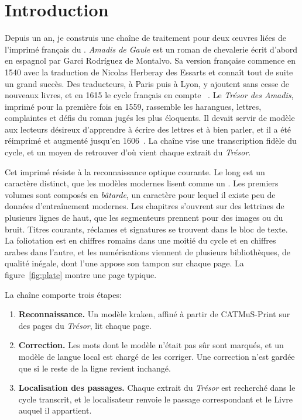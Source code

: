 \section{Introduction}
\label{sec:introduction}

Depuis un an, je construis une chaîne de traitement pour deux œuvres liées de
l'imprimé français du \sxvi. \emph{Amadis de Gaule} est un roman de
chevalerie écrit d'abord en espagnol par Garci Rodríguez de Montalvo. Sa
version française commence en 1540 avec la traduction de Nicolas Herberay des
Essarts et connaît tout de suite un grand succès. Des traducteurs, à Paris puis
à Lyon, y ajoutent sans cesse de nouveaux livres, et en 1615 le cycle français
en compte \ocrBooks{}~\cite{debuzon2011chappuys}. Le \emph{Trésor des Amadis},
imprimé pour la première fois en 1559, rassemble les harangues, lettres,
complaintes et défis du roman jugés les plus éloquents. Il devait servir de
modèle aux lecteurs désireux d'apprendre à écrire des lettres et à bien parler,
et il a été réimprimé et augmenté jusqu'en 1606~\cite{eman2026tresor}. La
chaîne vise une transcription fidèle du cycle, et un moyen de retrouver d'où
vient chaque extrait du \emph{Trésor}.

Cet imprimé résiste à la reconnaissance optique courante. Le  long est
un caractère distinct, que les modèles modernes lisent comme un . Les
premiers volumes sont composés en \emph{bâtarde}, un caractère pour lequel il
existe peu de données d'entraînement modernes. Les chapitres s'ouvrent sur des
lettrines de plusieurs lignes de haut, que les segmenteurs prennent pour des
images ou du bruit. Titres courants, réclames et signatures se trouvent dans le
bloc de texte. La foliotation est en chiffres romains dans une moitié du cycle
et en chiffres arabes dans l'autre, et les numérisations viennent de plusieurs
bibliothèques, de qualité inégale, dont l'une appose son tampon sur chaque
page. La figure~\ref{fig:plate} montre une page typique.

La chaîne comporte trois étapes:
\begin{enumerate}
  \item \textbf{Reconnaissance.} Un modèle kraken, affiné à partir de
    CATMuS-Print sur des pages du \emph{Trésor}, lit chaque page.
  \item \textbf{Correction.} Les mots dont le modèle n'était pas sûr sont
    marqués, et un modèle de langue local est chargé de les corriger. Une
    correction n'est gardée que si le reste de la ligne revient inchangé.
  \item \textbf{Localisation des passages.} Chaque extrait du \emph{Trésor} est
    recherché dans le cycle transcrit, et le localisateur renvoie le passage
    correspondant et le Livre auquel il appartient.
\end{enumerate}

